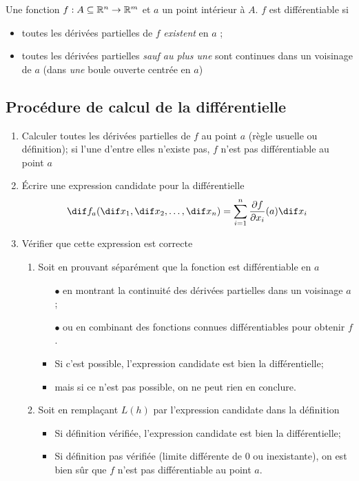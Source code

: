 \begin{myprop} Une fonction $f : A \subseteq \mathbb{R}^n \to \mathbb{R}^m$ et $a$ un point intérieur à $A$. $f$ est différentiable si
	\begin{itemize}
		\item toutes les dérivées partielles de $f$ \emph{existent} en $a$ ;
		\item toutes les dérivées partielles \emph{sauf au plus une} sont continues dans un voisinage de $a$ (dans \emph{une} boule ouverte centrée en $a$)
	\end{itemize}
\end{myprop}

\subsection{Procédure de calcul de la différentielle}
\begin{enumerate}
	\item Calculer toutes les dérivées partielles de $f$ au point $a$ (règle usuelle ou définition);
		si l'une d'entre elles n'existe pas, $f$ n'est pas différentiable au point $a$
	\item Écrire une expression candidate pour la différentielle
		\[ \dif f_a(\dif x_1, \dif x_2, \dots, \dif x_n) = \sum_{i = 1}^n \frac{\partial f}{\partial x_i}(a) \dif x_i \]
	\item Vérifier que cette expression est correcte
		\begin{enumerate}
			\item Soit en prouvant séparément que la fonction est différentiable en $a$
				\begin{itemize}
					\item[$\bullet$] en montrant la continuité des dérivées partielles dans un voisinage $a$;
					\item[$\bullet$] ou en combinant des fonctions connues différentiables pour obtenir $f$.
				\end{itemize}
				\begin{itemize}
					\item Si c'est possible, l'expression candidate est bien la différentielle;
					\item mais si ce n'est pas possible, on ne peut rien en conclure.
				\end{itemize}
			\item Soit en remplaçant $L(h)$ par l'expression candidate dans la définition
				\begin{itemize}
					\item Si définition vérifiée, l'expression candidate est bien la différentielle;
					\item Si définition pas vérifiée (limite différente de 0 ou inexistante),
						on est bien sûr que $f$ n'est pas différentiable au point $a$.
				\end{itemize}
		\end{enumerate}
\end{enumerate}

